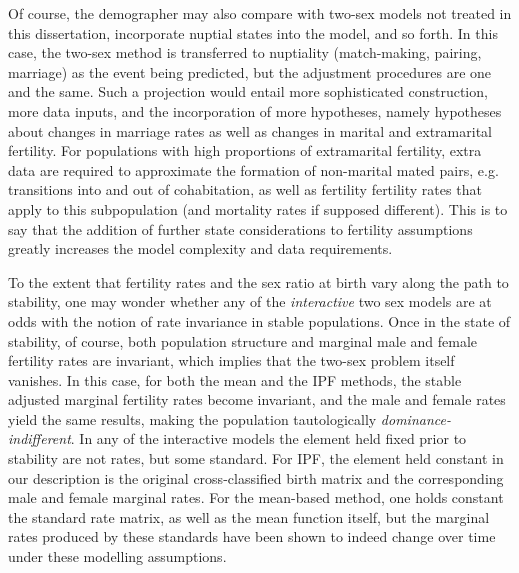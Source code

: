 Of course, the demographer may also compare with two-sex models not treated
in this dissertation, incorporate nuptial states into the model, and so
forth. In this case, the two-sex method is transferred to nuptiality
(match-making, pairing, marriage) as the event being predicted, but the
adjustment procedures are one and the same. Such a projection would
entail more sophisticated construction, more data inputs, and the incorporation of more hypotheses,
namely hypotheses about changes in marriage rates as well as changes in marital
and extramarital fertility. For populations with high proportions of
extramarital fertility, extra data are required to approximate the formation of
non-marital mated pairs, e.g. transitions into and out of cohabitation, as well
as fertility fertility rates that apply to this subpopulation (and mortality
rates if supposed different). This is to say that the addition of further state
considerations to fertility assumptions greatly increases the model complexity
and data requirements.

To the extent that fertility rates and the sex ratio at
birth vary along the path to stability, one may wonder whether any of the
\textit{interactive} two sex models are at odds with the notion of
rate invariance in stable populations. Once in the state of stability, of
course, both population structure and marginal male and female fertility rates are invariant, which
implies that the two-sex problem itself vanishes. In this case, for both the
mean and the IPF methods, the stable adjusted marginal fertility rates become
invariant, and the male and female rates yield the same results, making the
population tautologically \textit{dominance-indifferent}. In any of the
interactive models the element held fixed prior to stability are not rates, but
some standard. For IPF, the element held constant in our 
description is the original cross-classified birth matrix and the corresponding 
male and female marginal rates. For the mean-based method, one holds constant 
the standard rate matrix, as well as the mean function itself, but the marginal 
rates produced by these standards have been shown to indeed change over time
under these modelling assumptions.

